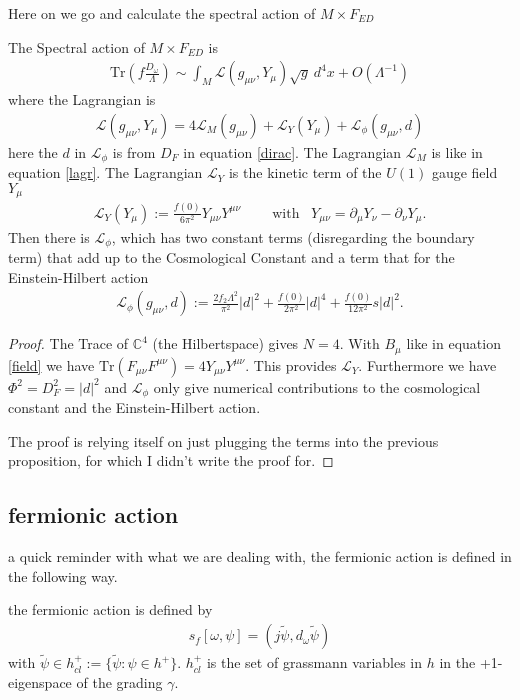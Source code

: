 Here on we go and calculate the spectral action of $M\times F_{ED}$
\begin{proposition}
    The Spectral action of $M\times F_{ED}$ is
    \begin{align}
        \text{Tr}(f\frac{D_\omega}{\Lambda}) \sim \int_M \mathcal{L}(g_{\mu\nu},
         Y_\mu) \sqrt{g}\ d^4x + O(\Lambda^{-1})
    \end{align}
    where the Lagrangian is
    \begin{align}
        \mathcal{L}(g_{\mu\nu}, Y_\mu) =
        4\mathcal{L}_M(g_{\mu\nu})+
        \mathcal{L}_Y(Y_\mu)+
        \mathcal{L}_\phi(g_{\mu\nu}, d)
    \end{align}
        here the $d$ in $\mathcal{L}_\phi$ is from $D_F$ in equation
        \ref{dirac}. The Lagrangian $\mathcal{L}_M$ is like in equation
        \ref{lagr}. The Lagrangian $\mathcal{L}_Y$ is the kinetic term of the
        $U(1)$ gauge field $Y_\mu$
    \begin{align}
        \mathcal{L}_Y(Y_\mu):= \frac{f(0)}{6\pi^2}
        Y_{\mu\nu}Y^{\mu\nu}\;\;\;\;\;\;\;\;\text{with}\;\;\;  Y_{\mu\nu} =
        \partial_\mu Y_\nu -
        \partial_\nu Y_\mu.
    \end{align}
    Then there is $\mathcal{L}_\phi$, which has two constant terms
    (disregarding the boundary term) that add up to the Cosmological Constant
    and a term that for the Einstein-Hilbert action
    \begin{align}
        \mathcal{L}_\phi(g_{\mu\nu}, d) := \frac{2f_2 \Lambda ^2}{\pi^2}
        |d|^2 + \frac{f(0)}{2\pi^2} |d|^4 + \frac{f(0)}{12\pi ^2} s |d|^2.
    \end{align}
\end{proposition}
\begin{proof}
    The Trace of $\mathbb{C}^4$ (the Hilbertspace) gives $N=4$. With $B_\mu$
    like in equation \ref{field} we have $\text{Tr}(F_{\mu\nu}
    F^{\mu\nu})=4Y_{\mu\nu}Y^{\mu\nu}$. This provides $\mathcal{L}_Y$.
    Furthermore we have $\Phi^2 = D_F^2 = |d|^2$ and $\mathcal{L}_\phi$ only
    give numerical contributions to the cosmological constant and the
    Einstein-Hilbert action.

    The proof is relying itself on just plugging the terms into the previous
    proposition, for which I didn't write the proof for.
\end{proof}


\subsection{fermionic action}
a quick reminder with what we are dealing with, the fermionic action is defined
in the following way.
\begin{definition}
    the fermionic action is defined by
    \begin{align}
        s_f[\omega, \psi] = (j\tilde{\psi}, d_\omega \tilde{\psi})
    \end{align}
    with $\tilde{\psi} \in h_{cl}^+ := \{\tilde{\psi}: \psi \in h^+\}$.
    $h_{cl}^+$ is the set of grassmann variables in $h$ in the +1-eigenspace
    of the grading $\gamma$.
\end{definition}


